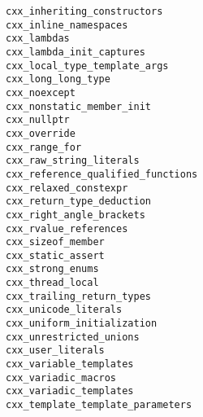 \documentclass{article}
\newcommand{\cmakecxxfeature}[1]{\lstinline{#1}}
\begin{document}
\begin{minipage}[t]{0.18\linewidth}
\cmakecxxfeature{cxx_inheriting_constructors}\\
\cmakecxxfeature{cxx_inline_namespaces}\\
\cmakecxxfeature{cxx_lambdas}\\
\cmakecxxfeature{cxx_lambda_init_captures}\\
\cmakecxxfeature{cxx_local_type_template_args}\\
\cmakecxxfeature{cxx_long_long_type}\\
\cmakecxxfeature{cxx_noexcept}\\
\cmakecxxfeature{cxx_nonstatic_member_init}\\
\cmakecxxfeature{cxx_nullptr}\\
\cmakecxxfeature{cxx_override}\\
\cmakecxxfeature{cxx_range_for}\\
\cmakecxxfeature{cxx_raw_string_literals}\\
\cmakecxxfeature{cxx_reference_qualified_functions}\\
\cmakecxxfeature{cxx_relaxed_constexpr}\\
\cmakecxxfeature{cxx_return_type_deduction}\\
\cmakecxxfeature{cxx_right_angle_brackets}\\
\cmakecxxfeature{cxx_rvalue_references}\\
\cmakecxxfeature{cxx_sizeof_member}\\
\cmakecxxfeature{cxx_static_assert}\\
\cmakecxxfeature{cxx_strong_enums}\\
\cmakecxxfeature{cxx_thread_local}\\
\cmakecxxfeature{cxx_trailing_return_types}\\
\cmakecxxfeature{cxx_unicode_literals}\\
\cmakecxxfeature{cxx_uniform_initialization}\\
\cmakecxxfeature{cxx_unrestricted_unions}\\
\cmakecxxfeature{cxx_user_literals}\\
\cmakecxxfeature{cxx_variable_templates}\\
\cmakecxxfeature{cxx_variadic_macros}\\
\cmakecxxfeature{cxx_variadic_templates}\\
\cmakecxxfeature{cxx_template_template_parameters}\\
\end{minipage}
\hfill\vline\hfill
\begin{minipage}[t]{0.18\linewidth}
\hfill\vline\hfill
\end{minipage}
\end{document}
